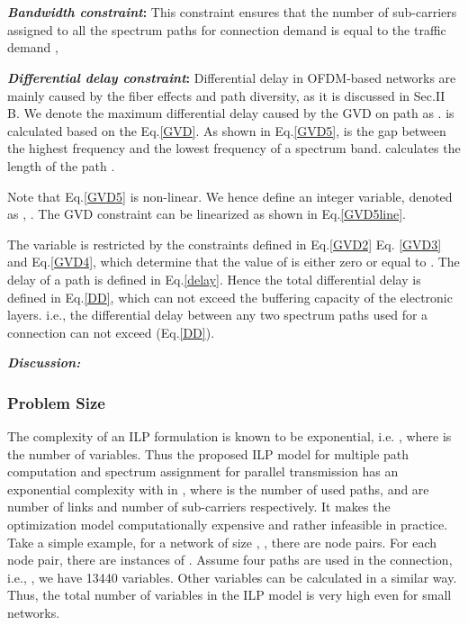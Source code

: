 \documentclass[conference]{IEEEtran}
\begin{document}
 \noindent \\
 \\
\textbf{\emph{ Bandwidth constraint}:} This constraint ensures that the number of  sub-carriers  assigned to all the spectrum paths for connection demand  is equal to the traffic demand , 

\textbf{\emph{Differential delay constraint}:} 
Differential delay in OFDM-based networks are mainly caused by the fiber effects and path diversity, as it is discussed in Sec.II B. We denote the  maximum differential delay caused by the GVD on path   as .  is calculated based on the Eq.\eqref{GVD}. As shown in Eq.\eqref{GVD5},  is the gap between the highest frequency and the lowest frequency of a spectrum band.  calculates the length of the path . 
 
Note that Eq.\eqref{GVD5} is non-linear. We hence define an integer variable, denoted as , . The GVD constraint can be linearized as shown in Eq.\eqref{GVD5line}.
 
The variable  is restricted by the constraints defined in  Eq.\eqref{GVD2} Eq. \eqref{GVD3} and 
Eq.\eqref{GVD4}, which determine that the value of  is either zero or equal to .   The delay of a path  is defined in Eq.\eqref{delay}. Hence the total differential delay is defined in Eq.\eqref{DD}, which can not   exceed the buffering capacity of the electronic layers.  i.e., the differential delay between any two spectrum paths used for a connection can not exceed  (Eq.\eqref{DD}).



  
 
\textbf{\emph{Discussion:}} 
\subsubsection{Problem Size}
The complexity of an ILP formulation is known to be exponential, i.e. , where  is the number of variables. Thus the
proposed ILP model for  multiple path computation and spectrum assignment for parallel transmission  has an exponential complexity with  in , where  is the number of used paths,  and  are number of links and number of sub-carriers respectively. It 
makes the optimization model computationally  expensive and rather infeasible in practice.  
Take a simple 
example, for a network of size , , there are  node pairs. For each node pair, there are  instances of .  
Assume  four paths are used in the connection, i.e., , we have 13440  variables.  Other variables can be calculated in a similar way. 
Thus, the total number of variables in  the ILP model is very high even for small networks. 
\end{document}
